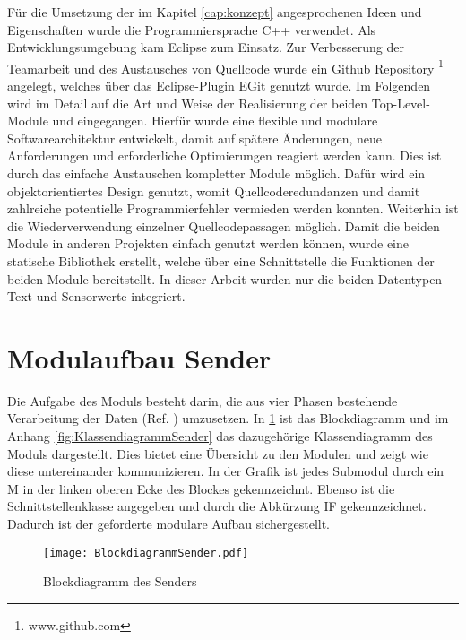 \label{cap:implementierung}
F{\"u}r die Umsetzung der im Kapitel \ref{cap:konzept} angesprochenen Ideen und
Eigenschaften wurde die Programmiersprache C++ verwendet. Als
Entwicklungsumgebung kam Eclipse zum Einsatz. Zur Verbesserung der Teamarbeit
und des Austausches von Quellcode wurde ein Github Repository
\footnote{www.github.com} angelegt, welches {\"u}ber das Eclipse-Plugin EGit
genutzt wurde. \newline
Im Folgenden wird im Detail auf die Art und Weise der Realisierung der beiden
Top-Level-Module  und  eingegangen. Hierf{\"u}r
wurde eine flexible und modulare Softwarearchitektur entwickelt, damit auf
sp{\"a}tere {\"A}nderungen, neue Anforderungen und erforderliche Optimierungen
reagiert werden kann. Dies ist durch das einfache Austauschen kompletter Module
m{\"o}glich.
Daf{\"u}r wird ein objektorientiertes Design genutzt, womit Quellcoderedundanzen und damit
zahlreiche potentielle Programmierfehler vermieden werden konnten.
Weiterhin ist die Wiederverwendung einzelner Quellcodepassagen m{\"o}glich.\newline
Damit die beiden Module in anderen Projekten einfach genutzt werden k{\"o}nnen,
wurde eine statische Bibliothek erstellt, welche {\"u}ber eine Schnittstelle die
Funktionen der beiden Module bereitstellt. In dieser Arbeit wurden nur die beiden
Datentypen Text und Sensorwerte integriert.

\section{Modulaufbau Sender}
 
Die Aufgabe des Moduls  besteht darin, die aus vier Phasen
bestehende Verarbeitung der Daten (Ref. \cite{Daher}) umzusetzen.
In \ref{fig:BlockdiagrammSender} ist das Blockdiagramm und im Anhang
\ref{fig:KlassendiagrammSender} das dazugehörige Klassendiagramm des Moduls
 dargestellt.
Dies bietet eine {\"U}bersicht zu den Modulen und zeigt wie diese untereinander 
kommunizieren. In der Grafik ist jedes Submodul durch ein M in der linken
oberen Ecke des Blockes gekennzeichnt. Ebenso ist die Schnittstellenklasse angegeben
und durch die Abk{\"u}rzung \gls{IF} gekennzeichnet. Dadurch ist der
geforderte modulare Aufbau sichergestellt.

\begin{figure}[H]
\centering
\texttt{[image: BlockdiagrammSender.pdf]} %
\caption{Blockdiagramm des Senders}
\label{fig:BlockdiagrammSender}
\end{figure}

